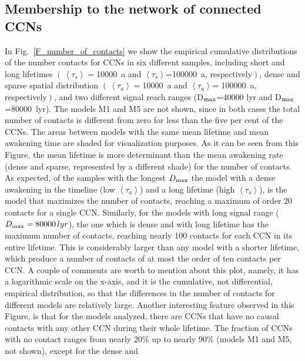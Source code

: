 \documentclass[crop]{CSLB}
\newcommand{\ceti}{CCN}
\newcommand{\cetis}{CCNs}
\newcommand{\ffn}[1]{}
\begin{document}


\subsection{Membership to the network of connected \cetis{}}\label{SS_members}

\ffn{3}
%
In Fig.~\ref{F_number_of_contacts} we show the empirical cumulative
distributions of the number contacts for \cetis{} in six different
samples, including short and long lifetimes
$\left(\,\left<\tau_s\right>=\right.$10000~a and
$\left<\tau_s\right>$=100000~a, respectively$\left.\right)$, dense
and sparse spatial distribution
$\left(\,\left<\tau_a\right>=\right.$10000~a and
$\left<\tau_a\right>$= 100000~a, respectively$\left.\right)$, and two
different signal reach ranges (D$_{\rm max}$=40000 lyr and
D$_{\rm max}$=80000~lyr).
%
The models M1 and M5 are not shown, since in both cases the total
number of contacts is different from zero for less than the five per
cent of the \cetis{}.
%
The areas between models with the same mean lifetime and mean
awakening time are shaded for visualization purposes.
%
As it can be seen from this Figure, the mean lifetime is more
determinant than the mean awakening rate (dense and sparse,
represented by a different shade) for the number of contacts.
%
As expected, of the samples with the longest $D_{\rm max}$ the model with
a dense awakening in the timeline (low $\left<\tau_a\right>$) and a
long lifetime (high $\left<\tau_s\right>$), is the model that
maximizes the number of contacts, reaching a maximum of order 20
contacts for a single \ceti{}.
%
Similarly, for the models with long signal range
($D_{\rm max}=80000\,lyr$), the one which is dense and with long lifetime
has the maximum number of contacts, reaching nearly 100 contacts for
each \ceti{} in its entire lifetime.
%
This is considerably larger than any model with a shorter lifetime,
which produce a number of contacts of at most the order of ten
contacts per \ceti{}.
%
A couple of comments are worth to mention about this plot, namely, it
has a logarithmic scale on the x-axis, and it is the cumulative, not
differential, empirical distribution, so that the differences in the
number of contacts for different models are relatively large.
%
Another interesting feature observed in this Figure, is that for the
models analyzed, there are \cetis{} that have no causal contacts with
any other \ceti{} during their whole lifetime.
%
The fraction of \cetis{} with no contact ranges from nearly 20\% up to
nearly 90\% (models M1 and M5, not shown), except for the dense and
\end{document}

